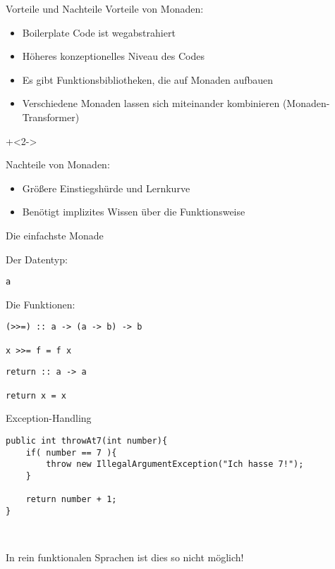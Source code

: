 \begin{frame}[fragile]{Vorteile und Nachteile}
Vorteile von Monaden:
\begin{itemize}
\item Boilerplate Code ist wegabstrahiert
\item Höheres konzeptionelles Niveau des Codes
\item Es gibt Funktionsbibliotheken, die auf Monaden aufbauen
\item Verschiedene Monaden lassen sich miteinander kombinieren (Monaden-Transformer)
\end{itemize}

\onslide+<2->
~

Nachteile von Monaden:
\begin{itemize}
\item Größere Einstiegshürde und Lernkurve
\item Benötigt implizites Wissen über die Funktionsweise
\end{itemize}

\end{frame}





\begin{frame}[fragile]{Die einfachste Monade}

Der Datentyp:
\begin{lstlisting}
a
\end{lstlisting}

Die Funktionen:
\begin{lstlisting}
(>>=) :: a -> (a -> b) -> b

x >>= f = f x
\end{lstlisting}


\begin{lstlisting}
return :: a -> a

return x = x
\end{lstlisting}

\end{frame}

\begin{frame}[fragile]{Exception-Handling}

\begin{lstlisting}
public int throwAt7(int number){
    if( number == 7 ){
        throw new IllegalArgumentException("Ich hasse 7!");
    }
    
    return number + 1;
}
\end{lstlisting}

~

In rein funktionalen Sprachen ist dies so nicht möglich!

\end{frame}


